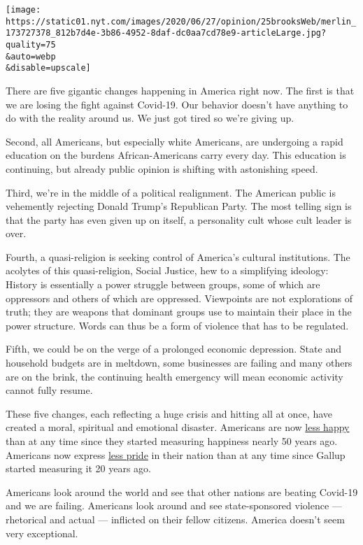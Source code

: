 \texttt{[image: https://static01.nyt.com/images/2020/06/27/opinion/25brooksWeb/merlin\_173727378\_812b7d4e-3b86-4952-8daf-dc0aa7cd78e9-articleLarge.jpg?quality=75\\\&auto=webp\\\&disable=upscale]}

There are five gigantic changes happening in America right now. The
first is that we are losing the fight against Covid-19. Our behavior
doesn't have anything to do with the reality around us. We just got
tired so we're giving up.

Second, all Americans, but especially white Americans, are undergoing a
rapid education on the burdens African-Americans carry every day. This
education is continuing, but already public opinion is shifting with
astonishing speed.

Third, we're in the middle of a political realignment. The American
public is vehemently rejecting Donald Trump's Republican Party. The most
telling sign is that the party has even given up on itself, a
personality cult whose cult leader is over.

Fourth, a quasi-religion is seeking control of America's cultural
institutions. The acolytes of this quasi-religion, Social Justice, hew
to a simplifying ideology: History is essentially a power struggle
between groups, some of which are oppressors and others of which are
oppressed. Viewpoints are not explorations of truth; they are weapons
that dominant groups use to maintain their place in the power structure.
Words can thus be a form of violence that has to be regulated.

Fifth, we could be on the verge of a prolonged economic depression.
State and household budgets are in meltdown, some businesses are failing
and many others are on the brink, the continuing health emergency will
mean economic activity cannot fully resume.

These five changes, each reflecting a huge crisis and hitting all at
once, have created a moral, spiritual and emotional disaster. Americans
are now
\href{https://www.norc.org/Research/Projects/Pages/covid-response-tracking-study.aspx}{less
happy} than at any time since they started measuring happiness nearly 50
years ago. Americans now express
\href{https://news.gallup.com/poll/312644/national-pride-falls-record-low.aspx}{less
pride} in their nation than at any time since Gallup started measuring
it 20 years ago.

Americans look around the world and see that other nations are beating
Covid-19 and we are failing. Americans look around and see
state-sponsored violence --- rhetorical and actual --- inflicted on
their fellow citizens. America doesn't seem very exceptional.

